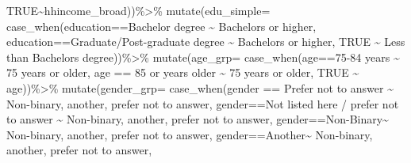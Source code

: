 \documentclass[
  12pt,
]{article}
\newenvironment{Shaded}{\begin{snugshade}}{\end{snugshade}}
\newcommand{\AttributeTok}[1]{\textcolor[rgb]{0.77,0.63,0.00}{#1}}
\newcommand{\ConstantTok}[1]{\textcolor[rgb]{0.00,0.00,0.00}{#1}}
\newcommand{\FunctionTok}[1]{\textcolor[rgb]{0.00,0.00,0.00}{#1}}
\newcommand{\NormalTok}[1]{#1}
\newcommand{\SpecialCharTok}[1]{\textcolor[rgb]{0.00,0.00,0.00}{#1}}
\newcommand{\StringTok}[1]{\textcolor[rgb]{0.31,0.60,0.02}{#1}}
\begin{document}
\begin{Shaded}
\begin{Highlighting}[]
                                 \ConstantTok{TRUE}\SpecialCharTok{\textasciitilde{}}\NormalTok{hhincome\_broad))}\SpecialCharTok{\%\textgreater{}\%}
  \FunctionTok{mutate}\NormalTok{(}\AttributeTok{edu\_simple=} \FunctionTok{case\_when}\NormalTok{(education}\SpecialCharTok{==}\StringTok{\textquotesingle{}Bachelor degree\textquotesingle{}} \SpecialCharTok{\textasciitilde{}} \StringTok{\textquotesingle{}Bachelors or higher\textquotesingle{}}\NormalTok{, }
\NormalTok{                               education}\SpecialCharTok{==}\StringTok{\textquotesingle{}Graduate/Post{-}graduate degree\textquotesingle{}} \SpecialCharTok{\textasciitilde{}} \StringTok{\textquotesingle{}Bachelors or higher\textquotesingle{}}\NormalTok{,}
                               \ConstantTok{TRUE} \SpecialCharTok{\textasciitilde{}} \StringTok{\textquotesingle{}Less than Bachelors degree\textquotesingle{}}\NormalTok{))}\SpecialCharTok{\%\textgreater{}\%}
  \FunctionTok{mutate}\NormalTok{(}\AttributeTok{age\_grp=} \FunctionTok{case\_when}\NormalTok{(age}\SpecialCharTok{==}\StringTok{\textquotesingle{}75{-}84 years\textquotesingle{}} \SpecialCharTok{\textasciitilde{}} \StringTok{\textquotesingle{}75 years or older\textquotesingle{}}\NormalTok{, }
\NormalTok{                            age }\SpecialCharTok{==} \StringTok{\textquotesingle{}85 or years older\textquotesingle{}} \SpecialCharTok{\textasciitilde{}} \StringTok{\textquotesingle{}75 years or older\textquotesingle{}}\NormalTok{,}
                            \ConstantTok{TRUE} \SpecialCharTok{\textasciitilde{}}\NormalTok{ age))}\SpecialCharTok{\%\textgreater{}\%}
  \FunctionTok{mutate}\NormalTok{(}\AttributeTok{gender\_grp=} \FunctionTok{case\_when}\NormalTok{(gender }\SpecialCharTok{==} \StringTok{\textquotesingle{}Prefer not to answer\textquotesingle{}} \SpecialCharTok{\textasciitilde{}} \StringTok{\textquotesingle{}Non{-}binary, another, prefer not to answer\textquotesingle{}}\NormalTok{,}
\NormalTok{                               gender}\SpecialCharTok{==}\StringTok{\textquotesingle{}Not listed here / prefer not to answer\textquotesingle{}} \SpecialCharTok{\textasciitilde{}} \StringTok{\textquotesingle{}Non{-}binary, another, prefer not to answer\textquotesingle{}}\NormalTok{,}
\NormalTok{                               gender}\SpecialCharTok{==}\StringTok{\textquotesingle{}Non{-}Binary\textquotesingle{}}\SpecialCharTok{\textasciitilde{}} \StringTok{\textquotesingle{}Non{-}binary, another, prefer not to answer\textquotesingle{}}\NormalTok{, }
\NormalTok{                               gender}\SpecialCharTok{==}\StringTok{\textquotesingle{}Another\textquotesingle{}}\SpecialCharTok{\textasciitilde{}} \StringTok{\textquotesingle{}Non{-}binary, another, prefer not to answer\textquotesingle{}}\NormalTok{,}

\end{Highlighting}
\end{Shaded}
\end{document}
